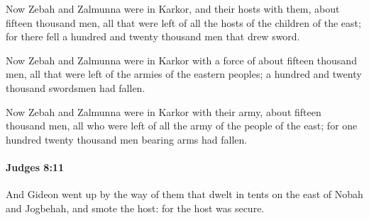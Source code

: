 			\begin{versebox}
					\item[BHS] 
					\item[ASV] Now Zebah and Zalmunna were in Karkor, and their hosts with them, about fifteen thousand men, all that were left of all the hosts of the children of the east; for there fell a hundred and twenty thousand men that drew sword.
					\item[NIV] Now Zebah and Zalmunna were in Karkor with a force of about fifteen thousand men, all that were left of the armies of the eastern peoples; a hundred and twenty thousand swordsmen had fallen.
					\item[NRSV] Now Zebah and Zalmunna were in Karkor with their army, about fifteen thousand men, all who were left of all the army of the people of the east; for one hundred twenty thousand men bearing arms had fallen.
			\end{versebox}

		\paragraph{Judges 8:11} %
			\label{JUDGES-8-11}

			And Gideon went up by the way of them that dwelt in tents on the east of Nobah and Jogbehah, and smote the host: for the host was secure.

